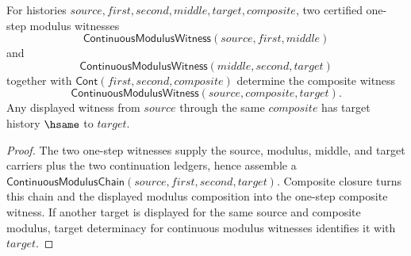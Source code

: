 \begin{theorem}
\label{thm:continuous-modulus-witness-composite-public-readback}
For histories $source,first,second,middle,target,composite$, two certified
one-step modulus witnesses
$$
\mathsf{ContinuousModulusWitness}(source,first,middle)
$$
and
$$
\mathsf{ContinuousModulusWitness}(middle,second,target)
$$
together with $\mathsf{Cont}(first,second,composite)$ determine the composite
witness
$$
\mathsf{ContinuousModulusWitness}(source,composite,target).
$$
Any displayed witness from $source$ through the same $composite$ has target
history $\hsame$ to $target$.
\end{theorem}
\begin{proof}
The two one-step witnesses supply the source, modulus, middle, and target
carriers plus the two continuation ledgers, hence assemble a
$\mathsf{ContinuousModulusChain}(source,first,second,target)$. Composite
closure turns this chain and the displayed modulus composition into the
one-step composite witness. If another target is displayed for the same source
and composite modulus, target determinacy for continuous modulus witnesses
identifies it with $target$.
\end{proof}

